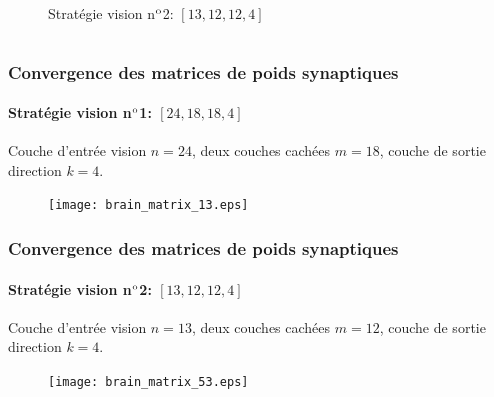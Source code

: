 \documentclass[10pt]{beamer}
\begin{document}
\begin{frame}
\begin{columns}[T]
\begin{column}{0.60\textwidth}
\begin{figure}
{
} 
\caption*{\tiny Stratégie vision n$\textsuperscript{o}$2: $\left[13, 12, 12, 4\right]$}
\end{figure}
\end{column}

\end{columns}

\end{frame}

\begin{frame}
  \frametitle{Convergence des matrices de poids synaptiques}
  \framesubtitle{Stratégie vision n$\textsuperscript{o}$1: $\left[24, 18, 18, 4\right]$}
  \footnotesize
\begin{center} 
  Couche d'entrée vision $n=24$, deux couches cachées $m=18$, couche de sortie direction $k=4$.
\end{center}

\begin{figure}
  \centering
  \texttt{[image: brain\_matrix\_13.eps]}
\end{figure}
\end{frame}

\begin{frame}
  \frametitle{Convergence des matrices de poids synaptiques}
  \framesubtitle{Stratégie vision n$\textsuperscript{o}$2: $\left[13, 12, 12, 4\right]$}
  \footnotesize
\begin{center} 
Couche d'entrée vision $n=13$, deux couches cachées $m=12$, couche de sortie direction $k=4$. 
\end{center}

 \begin{figure}
  \centering
  \texttt{[image: brain\_matrix\_53.eps]}
\end{figure}
\end{frame}
\end{document}

